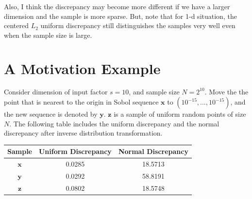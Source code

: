 \documentclass[12pt]{article}
\newcommand{\vx}{\boldsymbol{x}}
\newcommand{\vz}{\boldsymbol{z}}
\newcommand{\vy}{\boldsymbol{y}}
\begin{document}
Also, I think the discrepancy may become more different if we have a larger dimension and the sample is more sparse. But, note that for 1-d situation, the centered $L_2$ uniform discrepancy still distinguishes the samples very well even when the sample size is large.

\section{A Motivation Example}
Consider dimension of input factor $s=10$, and sample size $N=2^10$. Move the the point that is nearest to the origin in Sobol sequence $\vx$ to $(10^{-15},...,10^{-15})$, and the new sequence is denoted by $\vy$. $\vz$ is a sample of uniform random points of size $N$. The following table includes the uniform discrepancy and the normal discrepancy after inverse distribution transformation.
\begin{table}[H]
  \centering
    \begin{tabular}{ccc}
     Sample     & Uniform Discrepancy & Normal Discrepancy \\
    \hline
    $\vx$     & 0.0285 & 18.5713 \\
   $\vy$     & 0.0292 & 58.8191 \\
    $\vz$     & 0.0802 & 18.5748 \\
    \end{tabular}%
\end{table}%
\end{document}
